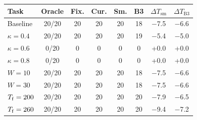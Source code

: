 \begin{tabular}{lccccccc}
\toprule
Task & Oracle & Fix. & Cur. & Sm. & B3 & $\Delta T_{\mathrm{sm}}$ & $\Delta T_{\mathrm{B3}}$ \\
\midrule
Baseline & 20/20 & 20 & 20 & 20 & 18 & $-$7.5 & $-$6.6 \\
$\kappa=0.4$ & 20/20 & 20 & 20 & 20 & 19 & $-$5.4 & $-$5.0 \\
$\kappa=0.6$ & 0/20 & 0 & 0 & 0 & 0 & +0.0 & +0.0 \\
$\kappa=0.8$ & 0/20 & 0 & 0 & 0 & 0 & +0.0 & +0.0 \\
$W=10$ & 20/20 & 20 & 20 & 20 & 18 & $-$7.5 & $-$6.6 \\
$W=30$ & 20/20 & 20 & 20 & 20 & 18 & $-$7.5 & $-$6.6 \\
$T_{\rm f}=200$ & 20/20 & 20 & 20 & 20 & 20 & $-$7.9 & $-$6.5 \\
$T_{\rm f}=260$ & 20/20 & 20 & 20 & 20 & 20 & $-$9.4 & $-$7.2 \\
\bottomrule
\end{tabular}
